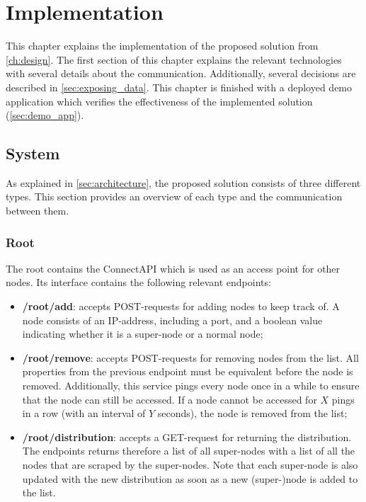 \chapter{Implementation}\label{ch:implementation}
This chapter explains the implementation of the proposed solution from \autoref{ch:design}. The first section of this chapter explains the relevant technologies with several details about the communication. Additionally, several decisions are described in \autoref{sec:exposing_data}. This chapter is finished with a deployed demo application which verifies the effectiveness of the implemented solution (\autoref{sec:demo_app}).

\section{System} \label{sec:interface}
As explained in \autoref{sec:architecture}, the proposed solution consists of three different types. This section provides an overview of each type and the communication between them.

\subsection{Root} \label{sec:impl-root}
The root contains the ConnectAPI which is used as an access point for other nodes. Its interface contains the following relevant endpoints:

\begin{itemize}
    \item \textbf{/root/add}: accepts POST-requests for adding nodes to keep track of. A node consists of an IP-address, including a port, and a boolean value indicating whether it is a super-node or a normal node;
    \item \textbf{/root/remove}: accepts POST-requests for removing nodes from the list. All properties from the previous endpoint must be equivalent before the node is removed. Additionally, this service pings every node once in a while to ensure that the node can still be accessed. If a node cannot be accessed for $X$ pings in a row (with an interval of $Y$ seconds), the node is removed from the list;
    \item \textbf{/root/distribution}: accepts a GET-request for returning the distribution. The endpoints returns therefore a list of all super-nodes with a list of all the nodes that are scraped by the super-nodes. Note that each super-node is also updated with the new distribution as soon as a new (super-)node is added to the list. 
\end{itemize}

